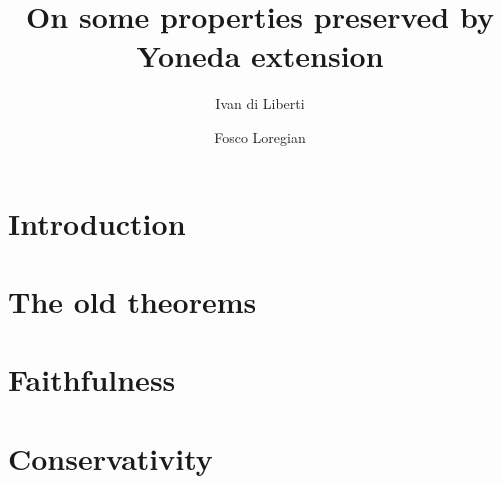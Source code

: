 \documentclass[a4paper,10pt]{amsart}
\author{Ivan di Liberti \and Fosco Loregian}
\title{On some properties preserved by Yoneda extension}
\begin{document}
\maketitle
\begin{abstract}

\end{abstract}
\section{Introduction}
	
\section{The old theorems}
	
\section{Faithfulness}
\section{Conservativity}
%
%
%
{}

\hrulefill 
\end{document}
